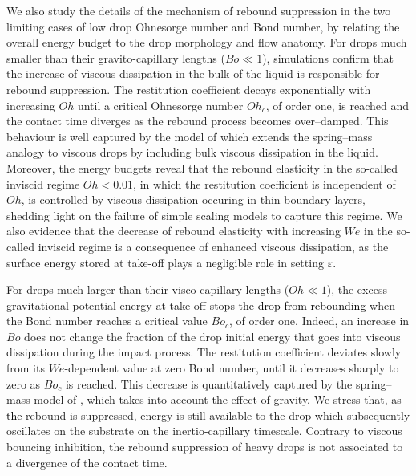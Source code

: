 \documentclass{jfm}
\newcommand{\Ohn}{\mathit{Oh}}
\newcommand{\Ohc}{\mathit{Oh}_\mathit{c}}
\newcommand{\Wen}{\mathit{We}}
\newcommand{\Bon}{\mathit{Bo}}
\newcommand{\Boc}{\mathit{Bo}_\mathit{c}}
\newcommand{\revRev}[1]{\textcolor{black}{#1}}
\begin{document}
We also study the details of the mechanism of rebound suppression in the two limiting cases of low drop Ohnesorge number and Bond number, by relating \revRev{the} overall energy \revRev{budget} to the drop morphology and flow anatomy. For drops much smaller than their gravito-capillary lengths ($\Bon \ll 1$), simulations confirm that the increase of viscous dissipation in the bulk of the liquid is responsible for rebound suppression. The restitution coefficient decays exponentially with increasing $\Ohn$ until a critical Ohnesorge number $\Ohc$, of order one, is reached and the contact time diverges as the rebound process becomes over--damped.
This behaviour is well captured by the model of \citet{jha2020viscous} which extends the spring--mass analogy to viscous drops by including bulk viscous dissipation in the liquid. 
Moreover, the energy budgets reveal that the rebound elasticity in the so-called inviscid regime $\Ohn < 0.01$, in which the restitution coefficient is independent of $\Ohn$, is controlled by viscous dissipation occuring in thin boundary layers, shedding light on the failure of simple scaling models to capture this regime. 
We also evidence that the decrease of rebound elasticity with increasing $\Wen$ in the so-called inviscid regime is a consequence of enhanced viscous dissipation, as the surface energy stored at take-off plays a negligible role in setting $\varepsilon$.

For drops much larger than their visco-capillary lengths ($\Ohn \ll 1$), the excess gravitational potential energy at take-off stops \revRev{the drop from rebounding} when the Bond number reaches a critical value $\Boc$, of order one.
Indeed, an increase in $\Bon$ does not change the fraction of the drop initial energy that goes into viscous dissipation during the impact process.
The restitution coefficient deviates slowly from its $\Wen$-dependent value at zero Bond number, until it decreases sharply to zero as $\Boc$ is reached.
This decrease is quantitatively captured by the spring--mass model of \citet{biance2006}, which takes into account the effect of gravity.
We stress that, as \revRev{the} rebound is suppressed, energy is still available to the drop which subsequently oscillates on the substrate on the inertio-capillary timescale. Contrary to viscous bouncing inhibition, the rebound suppression of heavy drops is not associated to a divergence of the contact time.
\end{document}

